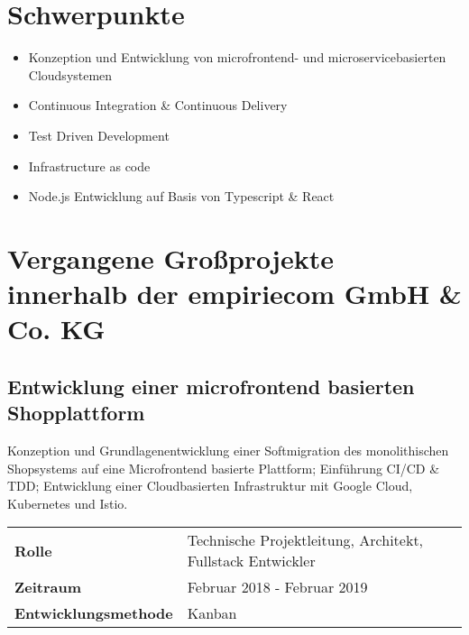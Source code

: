 \documentclass[10pt,ngerman,a4paper]{article}
\begin{document}
\section{Schwerpunkte}
\begin{itemize}
\item Konzeption und Entwicklung von microfrontend- und microservicebasierten Cloudsystemen
\item Continuous Integration \& Continuous Delivery
\item Test Driven Development
\item Infrastructure as code
\item Node.js Entwicklung auf Basis von Typescript \& React
\end{itemize}



\section{Vergangene Großprojekte innerhalb der empiriecom GmbH \& Co. KG}
\subsection{Entwicklung einer microfrontend basierten Shopplattform}
Konzeption und Grundlagenentwicklung einer Softmigration des monolithischen Shopsystems auf eine Microfrontend basierte Plattform; Einführung CI/CD \& TDD; Entwicklung einer Cloudbasierten Infrastruktur mit Google Cloud, Kubernetes und Istio.

\begin{tabular}{ll}
\textbf{Rolle} & Technische Projektleitung, Architekt, Fullstack Entwickler\\
\textbf{Zeitraum} & Februar 2018 - Februar 2019\\
\textbf{Entwicklungsmethode} & Kanban
\end{tabular}
\end{document}
